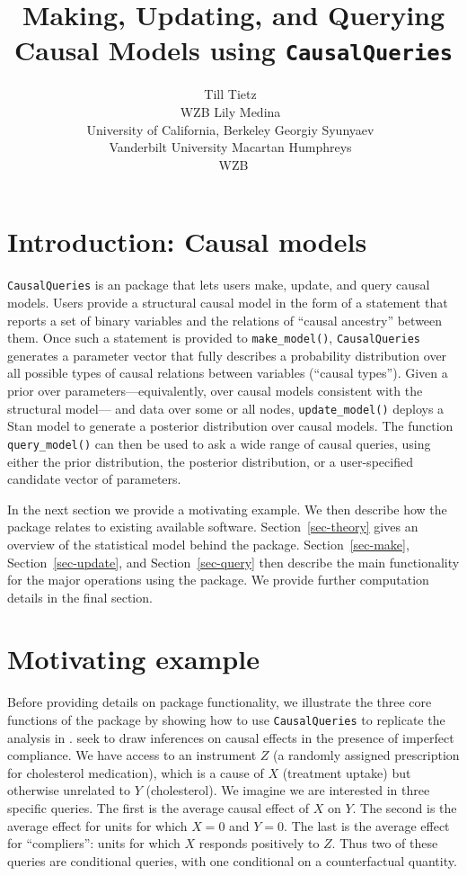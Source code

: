 \documentclass[
  11pt,
  article]{jss}
\author{Till Tietz~\orcidlink{0000-0002-2916-9059}\\WZB \And Lily
Medina~\orcidlink{0009-0004-2423-524X}\\University of California,
Berkeley \AND Georgiy
Syunyaev~\orcidlink{0000-0002-4391-6313}\\Vanderbilt
University \And Macartan Humphreys~\orcidlink{0000-0001-7029-2326}\\WZB}
\title{Making, Updating, and Querying Causal Models using
\texttt{CausalQueries}}
\begin{document}
\maketitle
\hypertarget{sec-intro}{%
\section{Introduction: Causal models}\label{sec-intro}}

\texttt{CausalQueries} is an  package that lets users make,
update, and query causal models. Users provide a structural causal model
in the form of a statement that reports a set of binary variables and
the relations of ``causal ancestry'' between them. Once such a statement
is provided to \texttt{make\_model()}, \texttt{CausalQueries} generates
a parameter vector that fully describes a probability distribution over
all possible types of causal relations between variables (``causal
types''). Given a prior over parameters---equivalently, over causal
models consistent with the structural model--- and data over some or all
nodes, \texttt{update\_model()} deploys a Stan
\citep{carpenter_stan_2017} model to generate a posterior distribution
over causal models. The function \texttt{query\_model()} can then be
used to ask a wide range of causal queries, using either the prior
distribution, the posterior distribution, or a user-specified candidate
vector of parameters.

In the next section we provide a motivating example. We then describe
how the package relates to existing available software.
Section~\ref{sec-theory} gives an overview of the statistical model
behind the package. Section~\ref{sec-make}, Section~\ref{sec-update},
and Section~\ref{sec-query} then describe the main functionality for the
major operations using the package. We provide further computation
details in the final section.

\hypertarget{motivating-example}{%
\section{Motivating example}\label{motivating-example}}

Before providing details on package functionality, we illustrate the
three core functions of the package by showing how to use
\texttt{CausalQueries} to replicate the analysis in
\citetext{\citealp{chickering_clinicians_1996}; \citealp[see
also][]{humphreys_integrated_2023}}. \citet{chickering_clinicians_1996}
seek to draw inferences on causal effects in the presence of imperfect
compliance. We have access to an instrument \(Z\) (a randomly assigned
prescription for cholesterol medication), which is a cause of \(X\)
(treatment uptake) but otherwise unrelated to \(Y\) (cholesterol). We
imagine we are interested in three specific queries. The first is the
average causal effect of \(X\) on \(Y\). The second is the average
effect for units for which \(X=0\) and \(Y=0\). The last is the average
effect for ``compliers'': units for which \(X\) responds positively to
\(Z\). Thus two of these queries are conditional queries, with one
conditional on a counterfactual quantity.
\end{document}
